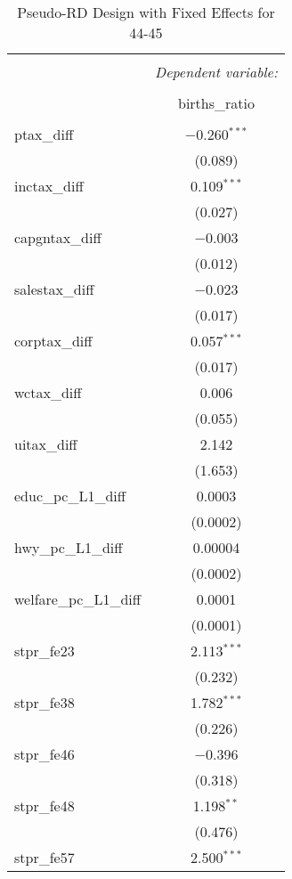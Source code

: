 
\begin{table}[!htbp] \centering 
  \caption{Pseudo-RD Design with Fixed Effects for  44-45} 
  \label{} 
\begin{tabular}{@{\extracolsep{5pt}}lc} 
\\[-1.8ex]\hline 
\hline \\[-1.8ex] 
 & \multicolumn{1}{c}{\textit{Dependent variable:}} \\ 
\cline{2-2} 
\\[-1.8ex] & births\_ratio \\ 
\hline \\[-1.8ex] 
 ptax\_diff & $-$0.260$^{***}$ \\ 
  & (0.089) \\ 
  inctax\_diff & 0.109$^{***}$ \\ 
  & (0.027) \\ 
  capgntax\_diff & $-$0.003 \\ 
  & (0.012) \\ 
  salestax\_diff & $-$0.023 \\ 
  & (0.017) \\ 
  corptax\_diff & 0.057$^{***}$ \\ 
  & (0.017) \\ 
  wctax\_diff & 0.006 \\ 
  & (0.055) \\ 
  uitax\_diff & 2.142 \\ 
  & (1.653) \\ 
  educ\_pc\_L1\_diff & 0.0003 \\ 
  & (0.0002) \\ 
  hwy\_pc\_L1\_diff & 0.00004 \\ 
  & (0.0002) \\ 
  welfare\_pc\_L1\_diff & 0.0001 \\ 
  & (0.0001) \\ 
  stpr\_fe23 & 2.113$^{***}$ \\ 
  & (0.232) \\ 
  stpr\_fe38 & 1.782$^{***}$ \\ 
  & (0.226) \\ 
  stpr\_fe46 & $-$0.396 \\ 
  & (0.318) \\ 
  stpr\_fe48 & 1.198$^{**}$ \\ 
  & (0.476) \\ 
  stpr\_fe57 & 2.500$^{***}$ \\ 

\end{tabular}
\end{table}
